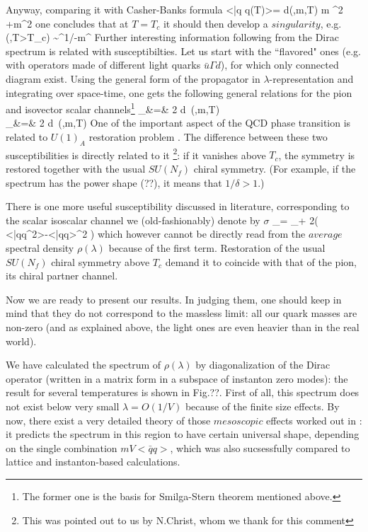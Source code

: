   Anyway, comparing it with Casher-Banks formula
\be
<\bar q q(T)>= \int d\lambda \rho(\lambda,m,T) {m \over \lambda^2 +m^2}
\ee
one concludes that at $T=T_c$ it should then develop a  $singularity$,
e.g.
\be
\rho(\lambda,T>T_c) \sim \lambda^{1/\delta-\alpha}m^\alpha
\ee
Further interesting information following from the Dirac spectrum is
related with susceptibilties. Let us start with the ``flavored" ones (e.g.
with operators made of different light quarks
$\bar u \Gamma d$), for which only connected diagram exist. Using the general
form of the propagator in $\lambda$-representation and integrating over
space-time, one gets the following general relations
for the pion and isovector scalar channels\footnote{The former one is
the basis for Smilga-Stern theorem mentioned above.}
\be
\chi_\pi    &=&  2 \int d\lambda \, \rho(\lambda,m,T)
                     \\
\chi_\delta &=&  2 \int d\lambda \, \rho(\lambda,m,T)
\ee
One of the important aspect of the QCD phase transition is
related to $U(1)_A$ restoration problem \cite{Shu_94}.
The difference between these two susceptibilities is directly related to it
\footnote{This was pointed out to us by N.Christ, whom we thank
for this comment}: if it vanishes
above $T_c$, the symmetry is restored
together with the usual $SU(N_f)$ chiral symmetry.
(For example, if the spectrum has the power shape (??), it means that
$1/\delta > 1$.)

   There is one more useful susceptibility discussed in literature,
corresponding to the scalar isoscalar channel we (old-fashionably) denote by
$\sigma$
\be
\chi_\sigma = \chi_\delta + 2\left( <\bar qq^2>-<\bar qq>^2 \right)
\ee
which however cannot be directly read from the $average$ spectral density
$\rho(\lambda)$ because of the first term.  Restoration of the
usual $SU(N_f)$ chiral symmetry above $T_c$ demand it to coincide with
that of the pion, its chiral partner channel.

   Now we are ready to present our results. In judging them, one should keep
in mind that they do not correspond to the massless limit: all our quark
masses are non-zero (and as explained above, the light ones are even heavier
than in the real world).

   We have calculated the spectrum
of  $\rho(\lambda)$ by diagonalization of the
Dirac operator (written in a matrix form in a subspace of instanton zero
modes): the result for several temperatures is shown in Fig.??.
   First of all, this spectrum does not exist below
very small $\lambda=O(1/V)$ because of
the finite size effects. By now, there exist a
 very detailed theory of those $mesoscopic$ effects worked out in
\cite{LS_92,VZ_93}: it predicts the spectrum in this region to have certain
universal shape, depending on the single combination $m V <\bar q q>$, which
was also sucsessfully compared to lattice and instanton-based calculations.

